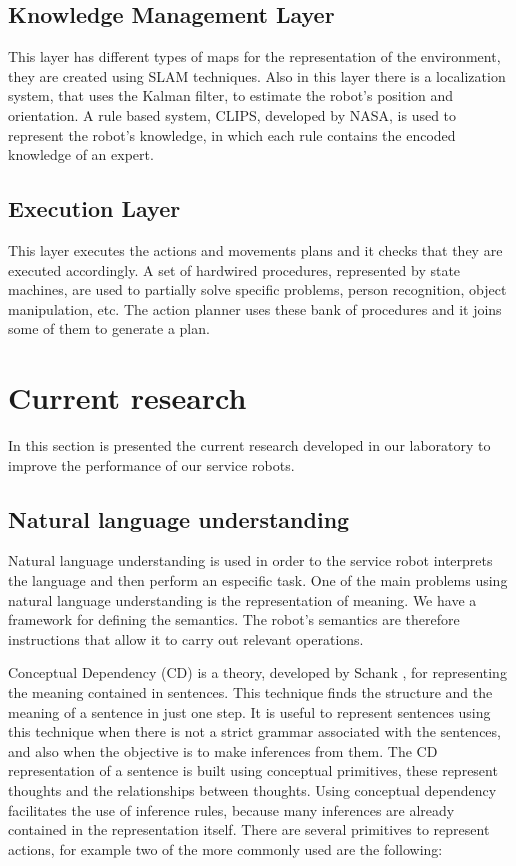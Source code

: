 \documentclass{llncs}
\begin{document}
\subsection{Knowledge Management Layer}

This layer has different types of maps for the representation of the environment, they are created using 
SLAM techniques.
Also in this layer there is a localization system, that uses the Kalman filter, to estimate the robot's position and orientation.
A rule based system, CLIPS, developed by NASA, is used to represent the robot's knowledge, in which each rule contains the encoded knowledge of an expert.


\subsection{Execution Layer}
This layer executes the actions and movements plans and it checks that they are executed accordingly.
A set of hardwired procedures, represented by state machines, are used to partially solve specific problems, person recognition, object manipulation, etc. The action planner uses these bank of procedures and it joins some of them to generate a plan.



\section{Current research}\label{sec:CurrentResearch}
In this section is presented the current research developed in our laboratory to improve the performance of our service robots.

\subsection{Natural language understanding}\label{subsec:NaturalLU}
Natural language understanding is used in order to the service robot interprets the language and then perform an especific task.
One of the main problems using natural language understanding is the representation of meaning.  
We have a framework for defining the semantics. The robot's semantics are therefore instructions that allow it to carry out relevant operations.

Conceptual Dependency (CD) is a theory, developed by Schank \cite{Schank}, for representing the meaning contained in sentences. 
This technique finds the structure and the meaning of a sentence in just one step. 
It is useful to represent sentences using this technique when there is not a strict grammar associated with the sentences, and also when the objective is to make inferences from them.
The CD representation of a sentence is built using conceptual primitives, these represent thoughts and the relationships between thoughts. Using conceptual dependency facilitates the use of inference rules, because many inferences are already contained in the representation itself.
There are several primitives to represent actions, for example two of the more commonly used are the following:
\end{document}
